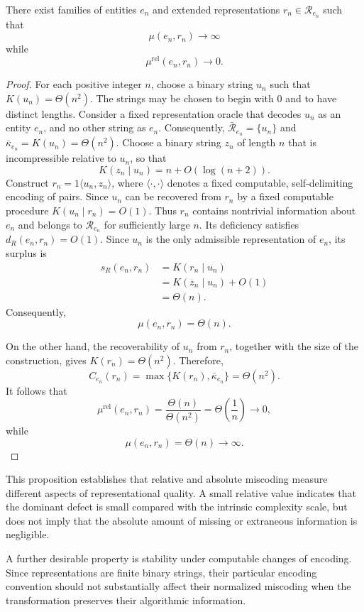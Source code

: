 \begin{proposition}
\label{prop:small_rel_not_small_abs}
There exist families of entities $e_n$ and extended representations $r_n\in\mathcal R_{e_n}$ such that
\[
\mu(e_n,r_n)\to\infty
\]
while
\[
\mu^{\mathrm{rel}}(e_n,r_n)\to 0.
\]
\end{proposition}
\begin{proof}
For each positive integer $n$, choose a binary string $u_n$ such that $K(u_n)=\Theta(n^2)$. The strings may be chosen to begin with $0$ and to have distinct lengths. Consider a fixed representation oracle that decodes $u_n$ as an entity $e_n$, and no other string as $e_n$. Consequently, $\bar{\mathcal R}_{e_n}=\{u_n\}$ and $\bar\kappa_{e_n}=K(u_n)=\Theta(n^2)$. Choose a binary string $z_n$ of length $n$ that is incompressible relative to $u_n$, so that
\[
K(z_n\mid u_n)=n+O(\log(n+2)).
\]
Construct $r_n = 1\langle u_n,z_n\rangle$, where $\langle\cdot,\cdot\rangle$ denotes a fixed computable, self-delimiting encoding of pairs. Since $u_n$ can be recovered from $r_n$ by a fixed computable procedure $K(u_n\mid r_n)=O(1)$. Thus $r_n$ contains nontrivial information about $e_n$ and belongs to $\mathcal R_{e_n}$
for sufficiently large $n$. Its deficiency satisfies $d_R(e_n,r_n)=O(1)$. Since $u_n$ is the only admissible representation of $e_n$, its surplus is
\[
\begin{aligned}
s_R(e_n,r_n)
&=K(r_n\mid u_n)\\
&=K(z_n\mid u_n)+O(1)\\
&=\Theta(n).
\end{aligned}
\]
Consequently,
\[
\mu(e_n,r_n)=\Theta(n).
\]

On the other hand, the recoverability of $u_n$ from $r_n$, together with the size of the construction, gives $K(r_n)=\Theta(n^2)$. Therefore,
\[
C_{e_n}(r_n) = \max\{K(r_n),\bar\kappa_{e_n}\} = \Theta(n^2).
\]
It follows that
\[
\mu^{\mathrm{rel}}(e_n,r_n) = \frac{\Theta(n)}{\Theta(n^2)} = \Theta\left(\frac{1}{n}\right) \longrightarrow 0,
\]
while
\[
\mu(e_n,r_n)=\Theta(n)\longrightarrow\infty.
\]
\end{proof}

This proposition establishes that relative and absolute miscoding measure different aspects of representational quality. A small relative value indicates that the dominant defect is small compared with the intrinsic complexity scale, but does not imply that the absolute amount of missing or extraneous information is negligible.

A further desirable property is stability under computable changes of encoding. Since representations are finite binary strings, their particular encoding convention should not substantially affect their normalized miscoding when the transformation preserves their algorithmic information.

